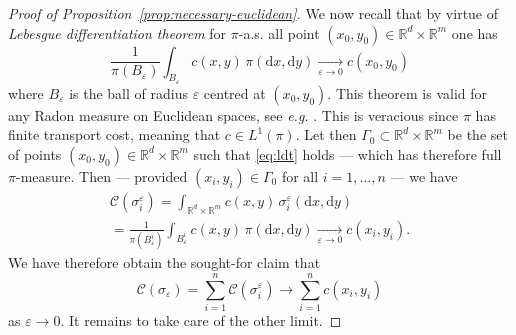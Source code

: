 \documentclass[leqno, 11pt, a4paper]{amsart}
\theoremstyle{definition}
\newcommand{\R}{\mathbb{R}}
\newcommand{\C}{\mathscr{C}}
\newcommand{\eps}{\varepsilon}
\newcommand{\cto}[1]{\xrightarrow[#1]{}}
\newcommand{\dd}{\mathrm{d}}
\begin{document}
\begin{proof}[Proof of Proposition~\ref{prop:necessary-euclidean}]
	We now recall that by virtue of \textit{Lebesgue differentiation theorem} for $\pi$-a.s. all point $(x_0, y_0) \in \R^d \times \R^m$ one has
	\begin{equation}\label{eq:ldt}
		\frac{1}{\pi(B_\eps)}\int_{B_\eps} c(x, y) \, \pi(\dd x, \dd y) \cto{\eps \to 0} c(x_0, y_0)
	\end{equation}
	where $B_\eps$ is the ball of radius $\eps$ centred at $(x_0, y_0)$. This theorem is valid for any Radon measure on Euclidean spaces, see \textit{e.g.} \cite[Theorem 8.4.6]{benedettoIntegrationModernAnalysis2009}. This is veracious since $\pi$ has finite transport cost, meaning that $c \in L^1(\pi)$. Let then $\Gamma_0 \subset \R^d \times \R^m$ be the set of points $(x_0, y_0) \in \R^d \times \R^m$ such that \eqref{eq:ldt} holds — which has therefore full $\pi$-measure. Then — provided $(x_i, y_i) \in \Gamma_0$ for all $i = 1, \dots,n$ — we have
	\begin{multline*}
	    	\C(\sigma_i^\eps) = \int_{\R^d \times \R^m} c(x, y) \, \sigma_i^\eps(\dd x, \dd y) \\= \frac1{\pi(B_\eps^i)}\int_{B_\eps^i} c(x, y) \, \pi(\dd x, \dd y) \cto{\eps \to 0} c(x_i, y_i).
	\end{multline*}
    We have therefore obtain the sought-for claim that $$\C(\sigma_\eps) = \sum_{i = 1}^n \C(\sigma_i^\eps) \to \sum_{i =1}^n c(x_i, y_i)$$ as $\eps \to 0$. It remains to take care of the other limit. 
    

\end{proof}
\end{document}
